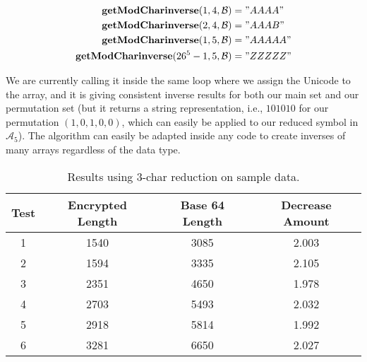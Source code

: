 \documentclass[amsmath,12pt,a4paper]{amsart}
\begin{document}
\begin{equation}\label{Eq54}
\begin{split}
\textbf{getModCharinverse}(1,4, \mathcal{B}) & = "AAAA"\\
\textbf{getModCharinverse}(2,4, \mathcal{B}) & = "AAAB"\\
\textbf{getModCharinverse}(1,5, \mathcal{B}) & = "AAAAA"\\
\textbf{getModCharinverse}(26^5-1,5, \mathcal{B}) & = "ZZZZZ"
\end{split}
\end{equation}

We are currently calling it inside the same loop where we assign the Unicode to the array, and it is giving consistent inverse results for both our main set and our permutation set (but it returns a string representation, i.e., $101010$ for our permutation $(1,0,1,0,0)$, which can easily be applied to our reduced symbol in $\mathcal{A}_5$). The algorithm can easily be adapted inside any code to create inverses of many arrays regardless of the data type.
 
 
 \begin{table}[h!]
\centering
\caption{Results using $3$-char reduction on sample data.}
\begin{tabular}{@{}cccc@{}}
\toprule
\textbf{Test} & \textbf{Encrypted Length} & \textbf{Base 64 Length} & \textbf{Decrease Amount} \\ \midrule
1             & 1540                   & 3085                      & 2.003                    \\
2             & 1594                   & 3335                      & 2.105                    \\
3             & 2351                   & 4650                      & 1.978                    \\
4             & 2703                   & 5493                      & 2.032                    \\
5             & 2918                   & 5814                      & 1.992                    \\
6             & 3281                   & 6650                      & 2.027                    \\ \bottomrule
\end{tabular}
\end{table}
\end{document}

